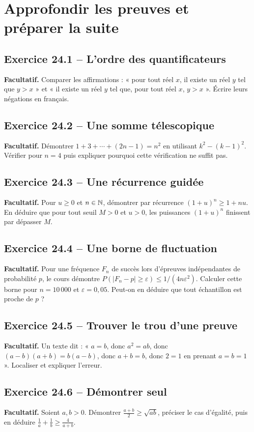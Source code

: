 \chapter{Approfondir les preuves et préparer la suite}
\section*{Exercice 24.1 -- L'ordre des quantificateurs}
\textbf{Facultatif.} Comparer les affirmations : « pour tout réel $x$, il existe un réel $y$ tel que $y>x$ » et « il existe un réel $y$ tel que, pour tout réel $x$, $y>x$ ». Écrire leurs négations en français.

\section*{Exercice 24.2 -- Une somme télescopique}
\textbf{Facultatif.} Démontrer $1+3+\cdots+(2n-1)=n^2$ en utilisant $k^2-(k-1)^2$. Vérifier pour $n=4$ puis expliquer pourquoi cette vérification ne suffit pas.

\section*{Exercice 24.3 -- Une récurrence guidée}
\textbf{Facultatif.} Pour $u\ge0$ et $n\in\mathbb{N}$, démontrer par récurrence $(1+u)^n\ge1+nu$. En déduire que pour tout seuil $M>0$ et $u>0$, les puissances $(1+u)^n$ finissent par dépasser $M$.

\section*{Exercice 24.4 -- Une borne de fluctuation}
\textbf{Facultatif.} Pour une fréquence $F_n$ de succès lors d'épreuves indépendantes de probabilité $p$, le cours démontre $P(|F_n-p|\ge\varepsilon)\le1/(4n\varepsilon^2)$. Calculer cette borne pour $n=10\,000$ et $\varepsilon=0{,}05$. Peut-on en déduire que tout échantillon est proche de $p$ ?

\section*{Exercice 24.5 -- Trouver le trou d'une preuve}
\textbf{Facultatif.} Un texte dit : « $a=b$, donc $a^2=ab$, donc $(a-b)(a+b)=b(a-b)$, donc $a+b=b$, donc $2=1$ en prenant $a=b=1$ ». Localiser et expliquer l'erreur.

\section*{Exercice 24.6 -- Démontrer seul}
\textbf{Facultatif.} Soient $a,b>0$. Démontrer $\frac{a+b}{2}\ge\sqrt{ab}$, préciser le cas d'égalité, puis en déduire $\frac1a+\frac1b\ge\frac4{a+b}$.
